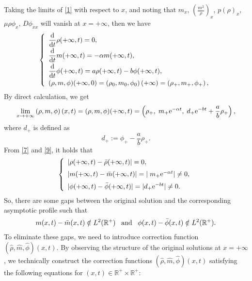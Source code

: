 \documentclass[11pt]{article}
\theoremstyle{plain}
\numberwithin{equation}{section}
\begin{document}
	Taking the limits of \eqref{1} with respect to $x$,
	and noting that $m_x$, $\left(\frac{m^2}{\rho}\right)_x$, $p(\rho)_x$,
	$\mu\rho\phi_x$,
	$D\phi_{xx}$ will vanish at $x=+\infty$,
	then we have
	\begin{equation}\notag
		\left\{
		\begin{array}{lr}
			\displaystyle\frac{{\rm d}}{{\rm d}t}\rho(+\infty,t)=0,\\[2mm]
			\displaystyle\frac{{\rm d}}{{\rm d}t}m(+\infty,t)=-\alpha m(+\infty,t),\\[2mm]
			\displaystyle\frac{{\rm d}}{{\rm d}t}\phi(+\infty,t)=a\rho(+\infty,t)-b\phi(+\infty,t),\\[2mm]
			(\rho,m,\phi)(+\infty,0)=\left(\rho_0,m_0,\phi_0\right)(+\infty)=\left(\rho_{+},m_{+},\phi_{+}\right),
		\end{array}
		\right.
	\end{equation}
	By direct calculation, we get
	\begin{equation}\label{9}
		\lim_{x\to+\infty}\left(\rho,m,\phi\right)(x,t)=(\rho,m,\phi)(+\infty,t)=\left(\rho_{+},\;m_{+}{\rm e}^{-\alpha t},\;d_{+}{\rm e}^{-bt}+\frac{a}{b}\rho_{+}\right),
	\end{equation}
	where $d_+$ is defined as
	\begin{equation}\label{9a}
		d_{+}:=\phi_{+}-\frac{a}{b}\rho_{+}.
	\end{equation}
	From \eqref{7} and \eqref{9},  it holds that
	\begin{equation}\label{2.44444}
		\left\{
		\begin{array}{lr}
			|\rho(+\infty,t)-\bar\rho(+\infty,t)|=0	,\\[2mm]
			|m(+\infty,t)-\bar m(+\infty,t)|=|\;m_{+}{\rm e}^{-\alpha t}|\neq 0	,\\[2mm]
			|\phi(+\infty,t)-\bar\phi(+\infty,t)|=|d_{+}{\rm e}^{-bt}|\neq 0	.
		\end{array}
		\right.
	\end{equation}
	So, there are some gaps between the original solution and the corresponding asymptotic profile such that 
	\[
	m(x,t)-\bar m(x,t)\notin L^2(\mathbb{R}^+) \;\;\;{\rm and}	\;\;\;\phi(x,t)-\bar \phi(x,t)\notin L^2(\mathbb{R}^+).\]
	To eliminate these gaps, we need to introduce correction function $(\hat\rho,\hat m,\hat\phi)(x,t)$.
	By observing the structure of
	the original solutions at $x=+\infty$, we  technically construct the correction functions $(\hat\rho,\hat m,\hat\phi)(x,t)$ satisfying the following equations for $(x,t)\in\mathbb{R}^+\times\mathbb{R}^{+}$:
\end{document}
